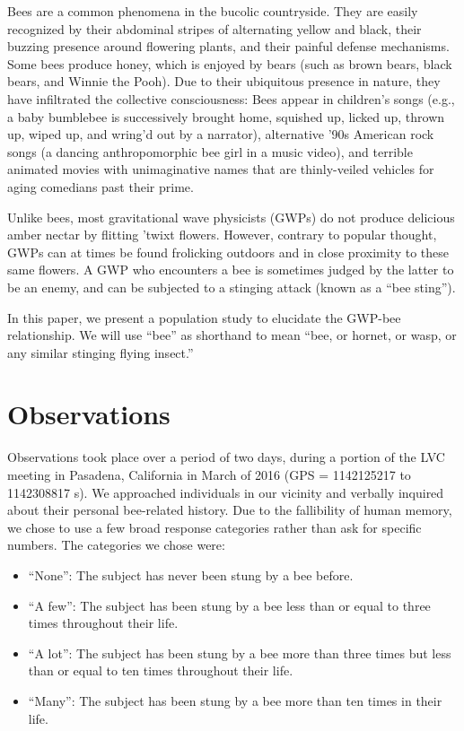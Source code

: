 \documentclass[aps,prl,preprint,groupedaddress,twocolumn]{revtex4-1}
\begin{document}
Bees are a common phenomena in the bucolic countryside. They are easily
recognized by their abdominal stripes of alternating yellow and black, their
buzzing presence around flowering plants, and their painful defense
mechanisms. Some bees produce honey, which is enjoyed by bears (such as
brown bears, black bears, and Winnie the Pooh). Due to their ubiquitous
presence in nature, they have infiltrated the collective consciousness:
Bees appear in children's songs (e.g., a baby bumblebee is successively
brought home, squished up, licked up, thrown up, wiped up, and wring'd out
by a narrator), alternative '90s American rock songs (a dancing
anthropomorphic bee girl in a music video), and terrible animated movies
with unimaginative names that are thinly-veiled vehicles for aging comedians
past their prime.

Unlike bees, most gravitational wave physicists (GWPs) do not produce delicious amber
nectar by flitting 'twixt flowers. However, contrary to popular thought,
GWPs can at times be found frolicking outdoors and in close proximity to these
same flowers. A GWP who encounters a bee is sometimes judged by the latter
to be an enemy, and can be subjected to a stinging attack (known as a
``bee sting'').

In this paper, we present a population study to elucidate the
GWP-bee relationship. We will use ``bee'' as shorthand
to mean ``bee, or hornet, or wasp, or any similar stinging flying insect.''


\section{Observations}

Observations took place over a period of two days, during a portion of
the LVC meeting in Pasadena, California in March of 2016 (GPS = 1142125217
to 1142308817 s). We approached individuals in our vicinity and verbally
inquired about their personal bee-related history. Due to the fallibility
of human memory, we chose to use a few broad response categories rather
than ask for specific numbers. The categories we chose were:
\begin{itemize}
\item ``None'': The subject has never been stung by a bee before.
\item ``A few'': The subject has been stung by a bee less than or equal
  to three times throughout their life.
\item ``A lot'': The subject has been stung by a bee more than three times
  but less than or equal to ten times throughout their life.
\item ``Many'': The subject has been stung by a bee more than ten times
  in their life.
\end{itemize}
\end{document}
